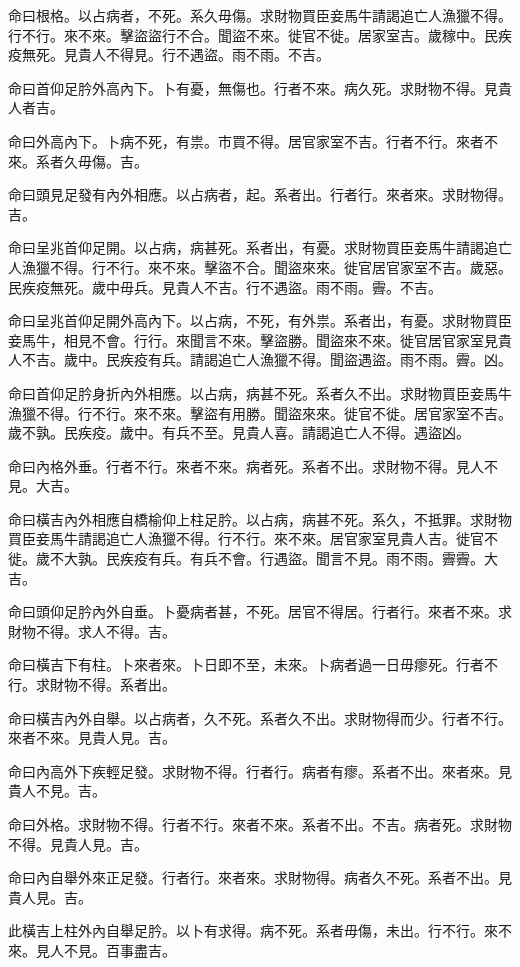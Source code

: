 命曰根格。以占病者，不死。系久毋傷。求財物買臣妾馬牛請謁追亡人漁獵不得。行不行。來不來。擊盜盜行不合。聞盜不來。徙官不徙。居家室吉。歲稼中。民疾疫無死。見貴人不得見。行不遇盜。雨不雨。不吉。

命曰首仰足肣外高內下。卜有憂，無傷也。行者不來。病久死。求財物不得。見貴人者吉。

命曰外高內下。卜病不死，有祟。市買不得。居官家室不吉。行者不行。來者不來。系者久毋傷。吉。

命曰頭見足發有內外相應。以占病者，起。系者出。行者行。來者來。求財物得。吉。

命曰呈兆首仰足開。以占病，病甚死。系者出，有憂。求財物買臣妾馬牛請謁追亡人漁獵不得。行不行。來不來。擊盜不合。聞盜來來。徙官居官家室不吉。歲惡。民疾疫無死。歲中毋兵。見貴人不吉。行不遇盜。雨不雨。霽。不吉。

命曰呈兆首仰足開外高內下。以占病，不死，有外祟。系者出，有憂。求財物買臣妾馬牛，相見不會。行行。來聞言不來。擊盜勝。聞盜來不來。徙官居官家室見貴人不吉。歲中。民疾疫有兵。請謁追亡人漁獵不得。聞盜遇盜。雨不雨。霽。凶。

命曰首仰足肣身折內外相應。以占病，病甚不死。系者久不出。求財物買臣妾馬牛漁獵不得。行不行。來不來。擊盜有用勝。聞盜來來。徙官不徙。居官家室不吉。歲不孰。民疾疫。歲中。有兵不至。見貴人喜。請謁追亡人不得。遇盜凶。

命曰內格外垂。行者不行。來者不來。病者死。系者不出。求財物不得。見人不見。大吉。

命曰橫吉內外相應自橋榆仰上柱足肣。以占病，病甚不死。系久，不抵罪。求財物買臣妾馬牛請謁追亡人漁獵不得。行不行。來不來。居官家室見貴人吉。徙官不徙。歲不大孰。民疾疫有兵。有兵不會。行遇盜。聞言不見。雨不雨。霽霽。大吉。

命曰頭仰足肣內外自垂。卜憂病者甚，不死。居官不得居。行者行。來者不來。求財物不得。求人不得。吉。

命曰橫吉下有柱。卜來者來。卜日即不至，未來。卜病者過一日毋瘳死。行者不行。求財物不得。系者出。

命曰橫吉內外自舉。以占病者，久不死。系者久不出。求財物得而少。行者不行。來者不來。見貴人見。吉。

命曰內高外下疾輕足發。求財物不得。行者行。病者有瘳。系者不出。來者來。見貴人不見。吉。

命曰外格。求財物不得。行者不行。來者不來。系者不出。不吉。病者死。求財物不得。見貴人見。吉。

命曰內自舉外來正足發。行者行。來者來。求財物得。病者久不死。系者不出。見貴人見。吉。

此橫吉上柱外內自舉足肣。以卜有求得。病不死。系者毋傷，未出。行不行。來不來。見人不見。百事盡吉。

